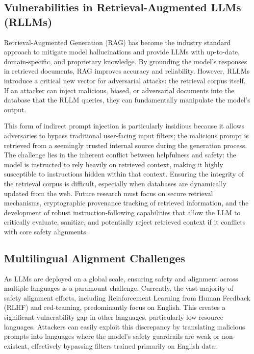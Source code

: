 \documentclass[11pt,a4paper]{article}
\begin{document}
\subsection{Vulnerabilities in Retrieval-Augmented LLMs (RLLMs)}
Retrieval-Augmented Generation (RAG) has become the industry standard approach to mitigate model hallucinations and provide LLMs with up-to-date, domain-specific, and proprietary knowledge. By grounding the model's responses in retrieved documents, RAG improves accuracy and reliability. However, RLLMs introduce a critical new vector for adversarial attacks: the retrieval corpus itself. If an attacker can inject malicious, biased, or adversarial documents into the database that the RLLM queries, they can fundamentally manipulate the model's output. 

This form of indirect prompt injection is particularly insidious because it allows adversaries to bypass traditional user-facing input filters; the malicious prompt is retrieved from a seemingly trusted internal source during the generation process. The challenge lies in the inherent conflict between helpfulness and safety: the model is instructed to rely heavily on retrieved context, making it highly susceptible to instructions hidden within that context. Ensuring the integrity of the retrieval corpus is difficult, especially when databases are dynamically updated from the web. Future research must focus on secure retrieval mechanisms, cryptographic provenance tracking of retrieved information, and the development of robust instruction-following capabilities that allow the LLM to critically evaluate, sanitize, and potentially reject retrieved context if it conflicts with core safety alignments.

\subsection{Multilingual Alignment Challenges}
As LLMs are deployed on a global scale, ensuring safety and alignment across multiple languages is a paramount challenge. Currently, the vast majority of safety alignment efforts, including Reinforcement Learning from Human Feedback (RLHF) and red-teaming, predominantly focus on English. This creates a significant vulnerability gap in other languages, particularly low-resource languages. Attackers can easily exploit this discrepancy by translating malicious prompts into languages where the model's safety guardrails are weak or non-existent, effectively bypassing filters trained primarily on English data. 
\end{document}
